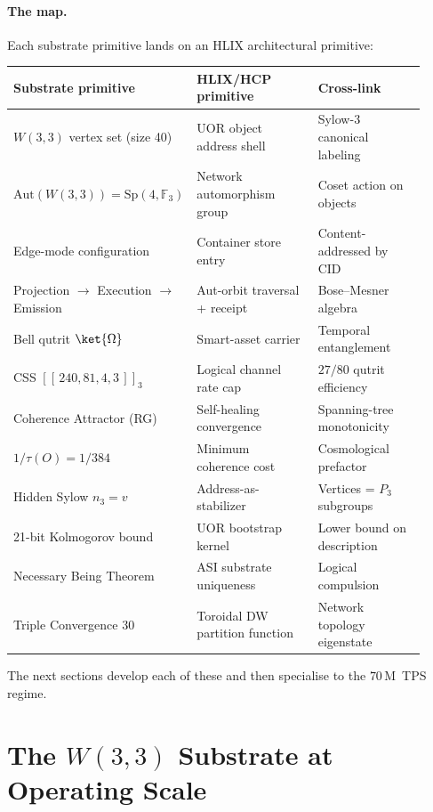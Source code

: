\documentclass[11pt,letterpaper]{article}
\theoremstyle{remark}
\newcommand{\W}{W(3,3)}
\newcommand{\Sp}{\mathrm{Sp}}
\newcommand{\Aut}{\mathrm{Aut}}
\newcommand{\FF}{\mathbb{F}}
\begin{document}
\paragraph{The map.} Each substrate primitive lands on an HLIX architectural primitive:
\begin{center}
\renewcommand{\arraystretch}{1.15}
\begin{tabular}{p{0.32\linewidth} p{0.32\linewidth} p{0.28\linewidth}}
\toprule
\textbf{Substrate primitive} & \textbf{HLIX/HCP primitive} & \textbf{Cross-link} \\
\midrule
$\W$ vertex set (size 40) & UOR object address shell & Sylow-$3$ canonical labeling \\
$\Aut(\W)=\Sp(4,\FF_3)$ & Network automorphism group & Coset action on objects \\
Edge-mode configuration & Container store entry & Content-addressed by CID \\
Projection $\to$ Execution $\to$ Emission & Aut-orbit traversal + receipt & Bose--Mesner algebra \\
Bell qutrit $\ket{\Omega}$ & Smart-asset carrier & Temporal entanglement \\
CSS $[[\,240,81,4,3\,]]_3$ & Logical channel rate cap & $27/80$ qutrit efficiency \\
Coherence Attractor (RG) & Self-healing convergence & Spanning-tree monotonicity \\
$1/\tau(O)=1/384$ & Minimum coherence cost & Cosmological prefactor \\
Hidden Sylow $n_3=v$ & Address-as-stabilizer & Vertices = $P_3$ subgroups \\
21-bit Kolmogorov bound & UOR bootstrap kernel & Lower bound on description \\
Necessary Being Theorem & ASI substrate uniqueness & Logical compulsion \\
Triple Convergence $30$ & Toroidal DW partition function & Network topology eigenstate \\
\bottomrule
\end{tabular}
\end{center}

The next sections develop each of these and then specialise to the $70$\,M~TPS regime.

\section{The $\W$ Substrate at Operating Scale}
\end{document}

